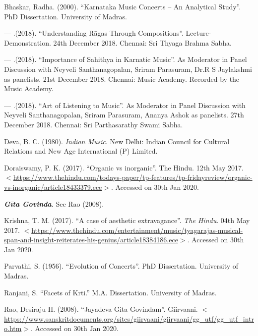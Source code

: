 \begin{thebibliography}{99}
\itemsep=0pt

  Bhaskar, Radha. (2000). “Karnataka Music Concerts – An Analytical Study”. PhD Dissertation. University of Madras.

  — .(2018). “Understanding Rāgas Through Compositions”. Lecture-Demonstration. 24th December 2018. Chennai: Sri Thyaga Brahma Sabha.

  — .(2018). “Importance of Sahithya in Karnatic Music”. As Moderator in Panel Discussion with Neyveli Santhanagopalan, Sriram Parasuram, Dr.R S Jaylakshmi as panelists. 21st December 2018. Chennai: Music Academy. Recorded by the Music Academy.

  — .(2018). “Art of Listening to Music”. As Moderator in Panel Discussion with Neyveli Santhanagopalan, Sriram Parasuram, Ananya Ashok as panelists. 27th December 2018. Chennai: Sri Parthasarathy Swami Sabha.

  Deva, B. C. (1980). \textit{Indian Music}. New Delhi: Indian Council for Cultural Relations and New Age International (P) Limited.

  Doraiswamy, P. K. (2017). “Organic vs inorganic”. The Hindu. 12th May 2017. $<$\url{https://www.thehindu.com/todays-paper/tp-features/tp-fridayreview/organic-vs-inorganic/article18433379.ece}$>$. Accessed on 30th Jan 2020.

  \textbf{\textit{Gīta Govinda}}. See Rao (2008).

  Krishna, T. M. (2017). “A case of aesthetic extravagance”. \textit{The Hindu}. 04th May 2017. $<$\url{https://www.thehindu.com/entertainment/music/tyagarajas-musical-span-and-insight-reiterates-his-genius/article18384186.ece}$>$. Accessed on 30th Jan 2020.

  Parvathi, S. (1956). “Evolution of Concerts”. PhD Dissertation. University of Madras.

  Ranjani, S. “Facets of Krti.” M.A. Dissertation. University of Madras.

  Rao, Desiraju H. (2008). “Jayadeva Gita Govindam”. Giirvaani. $<$\url{https://www.sanskritdocuments.org/sites/giirvaani/giirvaani/gg_utf/gg_utf_intro.htm}$>$. Accessed on 30th Jan 2020.


\end{thebibliography}
